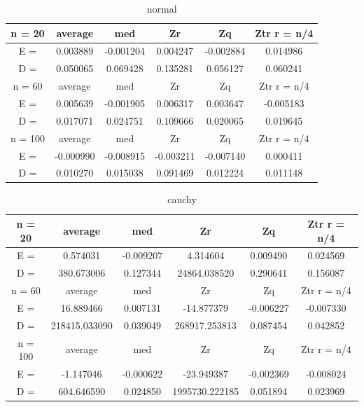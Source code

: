 \documentclass[12pt]{report}
\begin{document}
\begin{table}[H]
\caption{normal}
\label{tab:my_label1}
\begin{center}
\vspace{5mm}
\begin{tabular}{|c|c|c|c|c|c|}
\hline
n = 20    &average     &med         &Zr          &Zq          &Ztr r = n/4 \\
\hline
E =       &0.003889    &-0.001204   &0.004247    &-0.002884   &0.014986    \\
\hline
D =       &0.050065    &0.069428    &0.135281    &0.056127    &0.060241    \\
\hline
n = 60    &average     &med         &Zr          &Zq          &Ztr r = n/4 \\
\hline
E =       &0.005639    &-0.001905   &0.006317    &0.003647    &-0.005183   \\
\hline
D =       &0.017071    &0.024751    &0.109666    &0.020065    &0.019645    \\
\hline
n = 100   &average     &med         &Zr          &Zq          &Ztr r = n/4 \\
\hline
E =       &-0.000990   &-0.008915   &-0.003211   &-0.007140   &0.000411    \\
\hline
D =       &0.010270    &0.015038    &0.091469    &0.012224    &0.011148    \\
\hline
\end{tabular}
\end{center}
\end{table}

\begin{table}[H]
\caption{cauchy}
\label{tab:my_label2}
\begin{center}
\vspace{5mm}
\begin{tabular}{|c|c|c|c|c|c|}
\hline
n = 20    &average     &med         &Zr          &Zq          &Ztr r = n/4 \\
\hline
E =       &0.574031    &-0.009207   &4.314604    &0.009490    &0.024569    \\
\hline
D =       &380.673006  &0.127344    &24864.038520&0.290641    &0.156087    \\
\hline
n = 60    &average     &med         &Zr          &Zq          &Ztr r = n/4 \\
\hline
E =       &16.889466   &0.007131    &-14.877379  &-0.006227   &-0.007330   \\
\hline
D =       &218415.033090&0.039049    &268917.253813&0.087454    &0.042852    \\
\hline
n = 100   &average     &med         &Zr          &Zq          &Ztr r = n/4 \\
\hline
E =       &-1.147046   &-0.000622   &-23.949387  &-0.002369   &-0.008024   \\
\hline
D =       &604.646590  &0.024850    &1995730.222185&0.051894    &0.023969    \\
\hline
\end{tabular}
\end{center}
\end{table}
\end{document}

